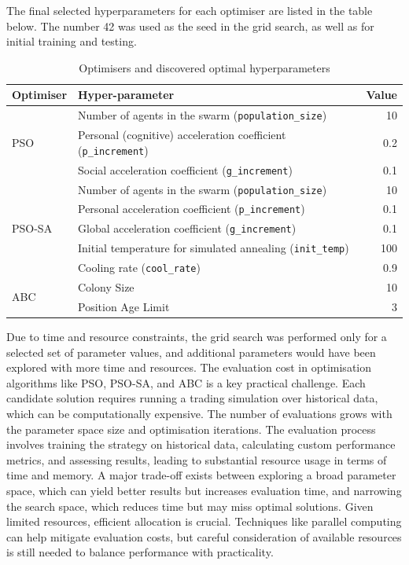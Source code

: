 \documentclass[a4paper, 12pt]{extarticle}
\begin{document}
The final selected hyperparameters for each optimiser are listed in the table below. The number 42 was used as the seed in the grid search, as well as for initial training and testing.  

\begin{table}[H]
    \centering
    \label{tab:optimizers}
    \begin{tabular}{llr}
      \toprule
      \textbf{Optimiser} & \textbf{Hyper-parameter}                          & \textbf{Value} \\ 
      \midrule
      \multirow{3}{*}{PSO}      
        & Number of agents in the swarm (\texttt{population\_size})       & 10   \\
        & Personal (cognitive) acceleration coefficient (\texttt{p\_increment}) & 0.2  \\
        & Social acceleration coefficient (\texttt{g\_increment})         & 0.1  \\
      \midrule
      \multirow{5}{*}{PSO-SA}   
        & Number of agents in the swarm (\texttt{population\_size})       & 10   \\
        & Personal acceleration coefficient (\texttt{p\_increment})      & 0.1  \\
        & Global acceleration coefficient (\texttt{g\_increment})        & 0.1  \\
        & Initial temperature for simulated annealing (\texttt{init\_temp}) & 100  \\
        & Cooling rate (\texttt{cool\_rate})                             & 0.9  \\
      \midrule
      \multirow{2}{*}{ABC}      
        & Colony Size                                                   & 10   \\
        & Position Age Limit                                            & 3    \\
      \bottomrule
    \end{tabular}
    \caption{Optimisers and discovered optimal hyperparameters}
\end{table}

Due to time and resource constraints, the grid search was performed only for a selected set of parameter values, and additional parameters would have been explored with more time and resources. The evaluation cost in optimisation algorithms like PSO, PSO-SA, and ABC is a key practical challenge. Each candidate solution requires running a trading simulation over historical data, which can be computationally expensive. The number of evaluations grows with the parameter space size and optimisation iterations. The evaluation process involves training the strategy on historical data, calculating custom performance metrics, and assessing results, leading to substantial resource usage in terms of time and memory. A major trade-off exists between exploring a broad parameter space, which can yield better results but increases evaluation time, and narrowing the search space, which reduces time but may miss optimal solutions. Given limited resources, efficient allocation is crucial. Techniques like parallel computing can help mitigate evaluation costs, but careful consideration of available resources is still needed to balance performance with practicality. 
\end{document}
